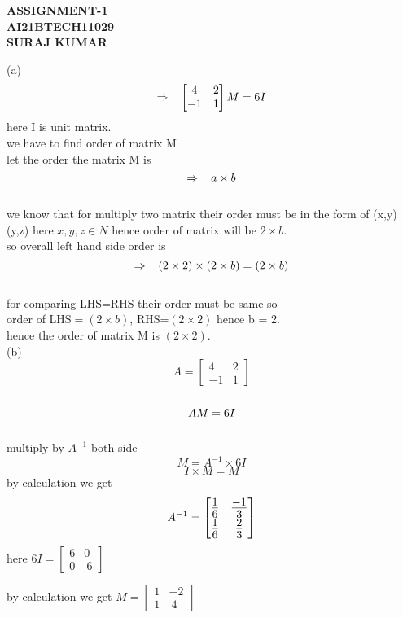 \documentclass[12pt]{book}
\begin{document}
\huge \centering \textbf{ASSIGNMENT-1}\\
\Large \centering \textbf{AI21BTECH11029}\\
\Large \centering \textbf{SURAJ KUMAR}\\
\begin{flushleft}
(a) $$\Rightarrow \hspace{3mm} \begin{bmatrix}
     4 & 2 \\
     -1 & 1 
      \end{bmatrix}M=6I$$  
    here I is unit matrix.\\
    we have to find order of matrix M\\
    let the order the matrix M is  $$ \Rightarrow \hspace{3mm} a\times b$$\\
      
      we know that for multiply two matrix their order must be in the form of  (x,y) (y,z)  here $x,y,z \in N$
      hence order of matrix will be $2\times b$.\\
      so overall left hand side order is  $$\Rightarrow \hspace{3mm} (2\times 2)\times(2\times b) =(2\times b)$$\\
      for comparing LHS=RHS their order must be same so \\
      order of LHS$=(2\times b)$,
      RHS=$(2\times 2)$  hence b = 2.\\
      hence the order of matrix M is $(2\times 2).$\\

(b)$$A=\begin{bmatrix}
      4 & 2\\
    -1 & 1
     \end{bmatrix}$$\\
$$\Large AM=6I$$\\
 multiply by $A^{-1}$ both side
 $$M=A^{-1}\times 6I$$  $$ I\times M=M$$
 by calculation we get   $$\Large A^{-1}=\begin{bmatrix}
      \frac{1}{6} & \frac{-1}{3}\\
    \frac{1}{6} & \frac{2}{3}
     \end{bmatrix}$$
\centering here $6I=\begin{bmatrix}
       6&0 \\
    0 & \ 6
     \end{bmatrix}$\\\vspace{5mm}
\raggedright by calculation we get $M=\begin{bmatrix}
       1&-2 \\
    1 & \ 4
     \end{bmatrix}$\\
\end{flushleft}
\end{document}
